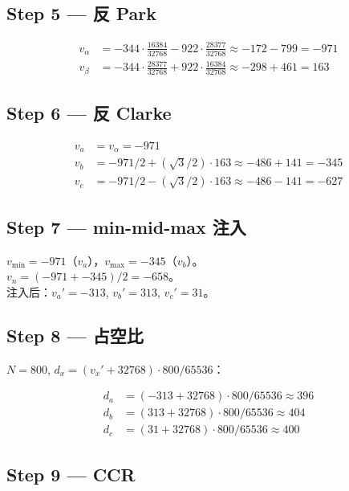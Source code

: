 \documentclass[UTF8,a4paper,11pt]{ctexart}
\begin{document}
\subsection*{Step 5 — 反 Park}
\begin{align*}
v_\alpha &= -344 \cdot \tfrac{16384}{32768} - 922 \cdot \tfrac{28377}{32768}
          \approx -172 - 799 = -971 \\
v_\beta  &= -344 \cdot \tfrac{28377}{32768} + 922 \cdot \tfrac{16384}{32768}
          \approx -298 + 461 = 163
\end{align*}

\subsection*{Step 6 — 反 Clarke}
\begin{align*}
v_a &= v_\alpha = -971 \\
v_b &= -971/2 + (\sqrt 3/2) \cdot 163 \approx -486 + 141 = -345 \\
v_c &= -971/2 - (\sqrt 3/2) \cdot 163 \approx -486 - 141 = -627
\end{align*}

\subsection*{Step 7 — min-mid-max 注入}

$v_\text{min} = -971$（$v_a$），$v_\text{max} = -345$（$v_b$）。\\
$v_n = (-971 + -345)/2 = -658$。\\
注入后：$v_a' = -313$, $v_b' = 313$, $v_c' = 31$。

\subsection*{Step 8 — 占空比}

$N = 800$, $d_x = (v_x' + 32768) \cdot 800 / 65536$：

\begin{align*}
d_a &= (-313 + 32768) \cdot 800 / 65536 \approx 396 \\
d_b &= ( 313 + 32768) \cdot 800 / 65536 \approx 404 \\
d_c &= (  31 + 32768) \cdot 800 / 65536 \approx 400
\end{align*}

\subsection*{Step 9 — CCR}
\end{document}
